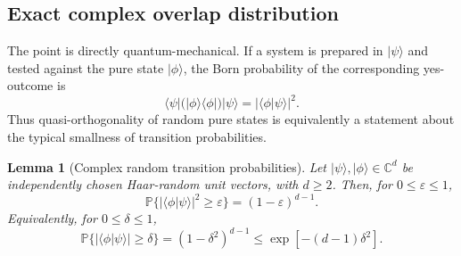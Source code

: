 \documentclass[aps,pra,reprint,superscriptaddress,nofootinbib,longbibliography]{revtex4-2}
\newtheorem{lemma}{Lemma}
\newcommand{\bra}[1]{\langle #1 |}
\newcommand{\ket}[1]{| #1 \rangle}
\newcommand{\eps}{\varepsilon}
\newcommand{\PP}{\mathbb{P}}
\begin{document}
\subsection*{Exact complex overlap distribution}

The point is directly quantum-mechanical.  If a system is prepared in
$\ket{\psi}$ and tested against the pure state $\ket{\phi}$, the Born
probability of the corresponding yes-outcome is
\begin{equation}
    \bra{\psi}\bigl(\ket{\phi}\bra{\phi}\bigr)\ket{\psi}
    =
    |\langle\phi|\psi\rangle|^2 .
    \label{eq:born-transition-probability}
\end{equation}
Thus quasi-orthogonality of random pure states is equivalently a statement
about the typical smallness of transition probabilities.

\begin{lemma}[Complex random transition probabilities]
\label{lem:complex-transition-probability}
Let $\ket{\psi},\ket{\phi}\in\mathbb C^d$ be independently chosen
Haar-random unit vectors, with $d\geq2$. Then, for $0\leq \eps\leq1$,
\begin{equation}
    \PP\{ |\langle\phi|\psi\rangle|^2\geq \eps\}
    =
    (1-\eps)^{d-1} .
    \label{eq:overlapExact}
\end{equation}
Equivalently, for $0\leq\delta\leq1$,
\begin{equation}
    \PP\{ |\langle\phi|\psi\rangle|\geq \delta\}
    =
    (1-\delta^2)^{d-1}
    \leq
    \exp[-(d-1)\delta^2] .
    \label{eq:complex-overlap-tail-delta}
\end{equation}
\end{lemma}
\end{document}
